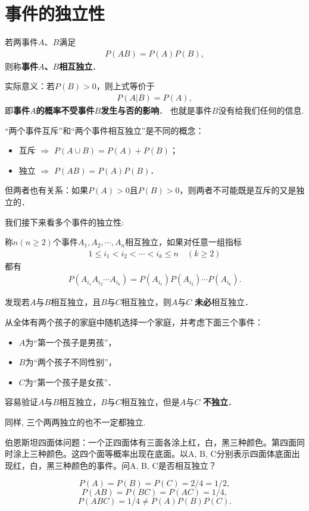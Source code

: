 \section{事件的独立性}

\begin{definition}
    若两事件$A$、$B$满足
    \begin{align*}
        P(AB)= P(A) P(B),
    \end{align*}
    则称\textbf{事件$A$、$B$相互独立}．%
\end{definition}

实际意义：若$P(B)>0$，则上式等价于
\begin{align*}
    P(A|B)= P(A),
\end{align*}
即\textbf{事件$A$的概率不受事件$B$发生与否的影响}． 也就是事件$B$没有给我们任何的信息.

\begin{remark}
    “两个事件互斥”和“两个事件相互独立”是不同的概念：
    \begin{itemize}
        \item 互斥 $\Rightarrow$ $P(A\cup B)=P(A)+P(B)$；
        \item 独立 $\Rightarrow$ $P(AB)=P(A)P(B)$．
    \end{itemize}
    但两者也有关系：如果$P(A)>0$且$P(B)>0$，则两者不可能既是互斥的又是独立的．
\end{remark}

我们接下来看多个事件的独立性:

\begin{definition}
    称$n(n\ge 2)$个事件$A_1, A_2, \cdots, A_n$相互独立，如果对任意一组指标
    \begin{align*}
        1\le i_1<i_2< \cdots <i_k\le n\quad (k\ge 2)
    \end{align*}
    都有
    \begin{align*}
        P(A_{i_1}A_{i_2}\cdots A_{i_k})=P(A_{i_1})P(A_{i_2})\cdots  P(A_{i_k}).
    \end{align*}
\end{definition}

发现若$A$与$B$相互独立，且$B$与$C$相互独立，则$A$与$C$ \textbf{未必}相互独立．
\begin{example}
    从全体有两个孩子的家庭中随机选择一个家庭，并考虑下面三个事件：
    \begin{itemize}
        \item $A$为“第一个孩子是男孩”，
        \item $B$为“两个孩子不同性别”，
        \item $C$为“第一个孩子是女孩”．
    \end{itemize}
    容易验证$A$与$B$相互独立，$B$与$C$相互独立，但是$A$与$C$ \textbf{不独立}．

    同样, 三个两两独立的也不一定都独立.

    伯恩斯坦四面体问题：一个正四面体有三面各涂上红，白，黑三种颜色。第四面同时涂上三种颜色。这四个面等概率出现在底面。以A, B, C分别表示四面体底面出现红，白，黑三种颜色的事件。问A, B, C是否相互独立？

    $$
        P(A)=P(B)=P(C)=2/4=1/2,
    $$
    $$
        P(AB)=P(BC)=P(AC)=1/4,
    $$
    $$
        P(ABC)=1/4\neq P(A)P(B)P(C).
    $$
\end{example}
